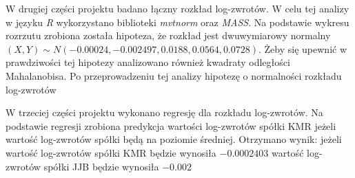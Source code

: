\documentclass[a4paper,11pt]{article}
\def\\{\hfill\break}
\begin{document}
W drugiej części projektu badano łączny rozkład log-zwrotów. W celu tej analizy w języku \textit{R} wykorzystano biblioteki \textit{mvtnorm} oraz \textit{MASS}. Na podstawie wykresu rozrzutu zrobiona została hipoteza, że rozkład jest dwuwymiarowy normalny \\ $(X, Y) \sim N(-0.00024, -0.002497, 0.0188, 0.0564, 0.0728)$. Żeby się upewnić w prawdziwości tej hipotezy analizowano również kwadraty odległości Mahalanobisa. Po przeprowadzeniu tej analizy hipotezę o normalności rozkładu log-zwrotów

W trzeciej części projektu wykonano regresję dla rozkładu log-zwrotów. Na podstawie regresji zrobiona predykcja wartości log-zwrotów spółki KMR jeżeli wartość log-zwrotów spółki będą na poziomie średniej. Otrzymano wynik: jeżeli wartość log-zwrotów spółki KMR będzie wynosiła $-0.0002403$ wartość log-zwrotów spółki JJB będzie wynosiła $-0.002$
\end{document}
